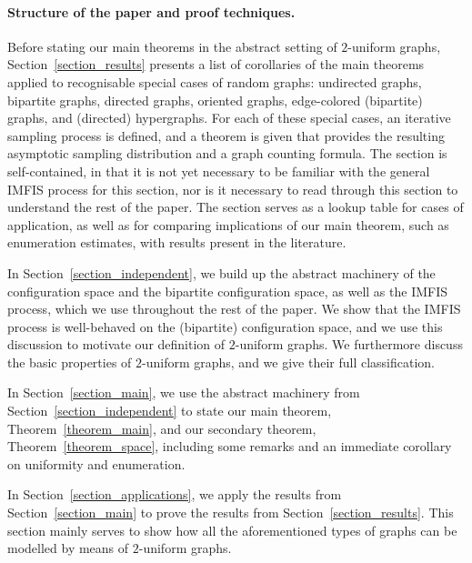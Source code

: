 \documentclass{article}
\theoremstyle{plain}
\theoremstyle{remark}
\theoremstyle{plain}
\numberwithin{equation}{section}
\begin{document}
	
	\paragraph*{Structure of the paper and proof techniques.} Before stating our main theorems in the abstract setting of $2$-uniform graphs, Section~\ref{section_results} presents a list of corollaries of the main theorems applied to recognisable special cases of random graphs: undirected graphs, bipartite graphs, directed graphs, oriented graphs, edge-colored (bipartite) graphs, and (directed) hypergraphs. For each of these special cases, an iterative sampling  process is defined, and a theorem is given that provides the resulting asymptotic sampling distribution and a graph counting formula. The section is self-contained, in that it is not yet necessary to be familiar with the general IMFIS process for this section, nor is it necessary to read through this section to understand the rest of the paper. The section serves as a lookup table for cases of application, as well as for comparing implications of our main theorem, such as enumeration estimates, with results present in the literature.
	
	In Section~\ref{section_independent}, we build up the abstract machinery of the configuration space and the bipartite configuration space, as well as the IMFIS process, which we use throughout the rest of the paper. We show that the IMFIS process is well-behaved on the (bipartite) configuration space, and we use this discussion to motivate our definition of $2$-uniform graphs. We furthermore discuss the basic properties of $2$-uniform graphs, and we give their full classification. 
	
	In Section~\ref{section_main}, we use the abstract machinery from Section~\ref{section_independent} to state our main theorem, Theorem~\ref{theorem_main}, and our secondary theorem, Theorem~\ref{theorem_space}, including some remarks and an immediate corollary on uniformity and enumeration.
	
	In Section~\ref{section_applications}, we apply the results from Section~\ref{section_main} to prove the results from Section~\ref{section_results}. This section mainly serves to show how all the aforementioned types of graphs can be modelled by means of $2$-uniform graphs. 
	
\end{document}
